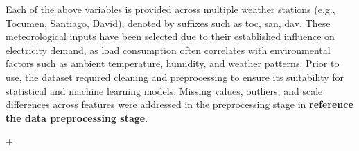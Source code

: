 Each of the above variables is provided across multiple weather stations (e.g., Tocumen, Santiago, David), denoted by suffixes such as toc, san, dav. These meteorological inputs have been selected due to their established influence on electricity demand, as load consumption often correlates with environmental factors such as ambient temperature, humidity, and weather patterns. Prior to use, the dataset required cleaning and preprocessing to ensure its suitability for statistical and machine learning models. Missing values, outliers, and scale differences across features were addressed in the preprocessing stage in \textbf{reference the data preprocessing stage}.

+